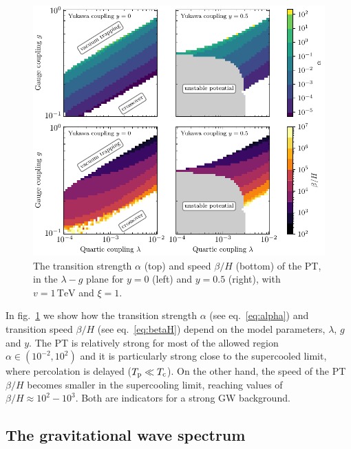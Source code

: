 \begin{figure}[t]
	\centering
	\includegraphics[width=\textwidth]{thesisplots/lisa/thesis_LISA_3}
	\caption{The transition strength $\alpha$ (top) and speed $\beta/H$ (bottom) of the \ac{PT}, in the $\lambda-g$ plane for $y = 0$ (left) and $y = 0.5$ (right), with $v= 1\,\text{TeV}$ and $\xi = 1$.}
	\label{fig:GWparams-alpha-beta}
\end{figure}

In fig.~\ref{fig:GWparams-alpha-beta} we show how the transition strength $\alpha$ (see eq.~\eqref{eq:alpha}) and transition speed $\beta/H$ (see eq.~\eqref{eq:betaH}) depend on the model parameters, $\lambda$, $g$ and $y$. The \ac{PT} is relatively  strong for most of the allowed region $\alpha \in (10^{-2}, 10^2)$ and it is particularly strong close to the supercooled limit, where percolation is delayed ($T_{\text{p}} \ll T_{\text{c}}$). On the other hand, the speed of the \ac{PT} $\beta/H$ becomes smaller in the supercooling limit, reaching values of $\beta/H \approx 10^2 - 10^3$. Both are indicators for a strong \ac{GW} background.


\subsection{The gravitational wave spectrum}
\label{sec:GWspec}

